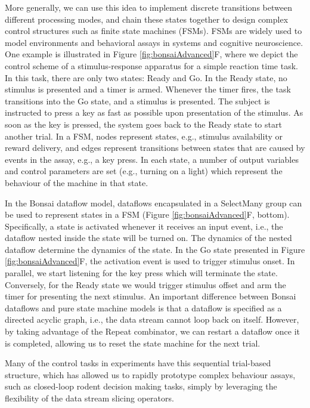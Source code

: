 More generally, we can use this idea to implement discrete transitions between different processing modes, and chain these states together to design complex control structures such as finite state machines (FSMs). FSMs are widely used to model environments and behavioral assays in systems and cognitive neuroscience. One example is illustrated in Figure \ref{fig:bonsaiAdvanced}F, where we depict the control scheme of a stimulus-response apparatus for a simple reaction time task. In this task, there are only two states: Ready and Go. In the Ready state, no stimulus is presented and a timer is armed. Whenever the timer fires, the task transitions into the Go state, and a stimulus is presented. The subject is instructed to press a key as fast as possible upon presentation of the stimulus. As soon as the key is pressed, the system goes back to the Ready state to start another trial. In a FSM, nodes represent states, e.g., stimulus availability or reward delivery, and edges represent transitions between states that are caused by events in the assay, e.g., a key press. In each state, a number of output variables and control parameters are set (e.g., turning on a light) which represent the behaviour of the machine in that state.

In the Bonsai dataflow model, dataflows encapsulated in a SelectMany group can be used to represent states in a FSM (Figure \ref{fig:bonsaiAdvanced}F, bottom). Specifically, a state is activated whenever it receives an input event, i.e., the dataflow nested inside the state will be turned on. The dynamics of the nested dataflow determine the dynamics of the state. In the Go state presented in Figure \ref{fig:bonsaiAdvanced}F, the activation event is used to trigger stimulus onset. In parallel, we start listening for the key press which will terminate the state. Conversely, for the Ready state we would trigger stimulus offset and arm the timer for presenting the next stimulus. An important difference between Bonsai dataflows and pure state machine models is that a dataflow is specified as a directed acyclic graph, i.e., the data stream cannot loop back on itself. However, by taking advantage of the Repeat combinator, we can restart a dataflow once it is completed, allowing us to reset the state machine for the next trial.

Many of the control tasks in experiments have this sequential trial-based structure, which has allowed us to rapidly prototype complex behaviour assays, such as closed-loop rodent decision making tasks, simply by leveraging the flexibility of the data stream slicing operators.

